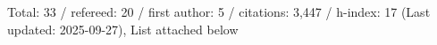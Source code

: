 Total: 33 / refereed: 20 / first author: 5 / citations: 3,447 / h-index: 17 (Last updated: 2025-09-27), List attached below